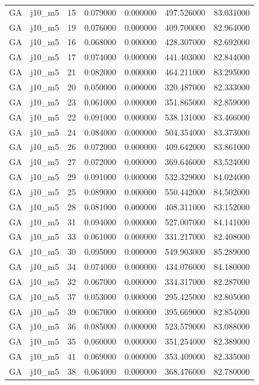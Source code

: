 \begin{tabular}{llrrrrr}
GA & j10_m5 & 15 & 0.079000 & 0.000000 & 497.526000 & 83.031000 \\
GA & j10_m5 & 19 & 0.076000 & 0.000000 & 409.700000 & 82.964000 \\
GA & j10_m5 & 16 & 0.068000 & 0.000000 & 428.307000 & 82.692000 \\
GA & j10_m5 & 17 & 0.074000 & 0.000000 & 441.403000 & 82.844000 \\
GA & j10_m5 & 21 & 0.082000 & 0.000000 & 464.211000 & 83.295000 \\
GA & j10_m5 & 20 & 0.050000 & 0.000000 & 320.487000 & 82.333000 \\
GA & j10_m5 & 23 & 0.061000 & 0.000000 & 351.865000 & 82.859000 \\
GA & j10_m5 & 22 & 0.091000 & 0.000000 & 538.131000 & 83.466000 \\
GA & j10_m5 & 24 & 0.084000 & 0.000000 & 504.354000 & 83.373000 \\
GA & j10_m5 & 26 & 0.072000 & 0.000000 & 409.642000 & 83.861000 \\
GA & j10_m5 & 27 & 0.072000 & 0.000000 & 369.646000 & 83.524000 \\
GA & j10_m5 & 29 & 0.091000 & 0.000000 & 532.329000 & 84.024000 \\
GA & j10_m5 & 25 & 0.089000 & 0.000000 & 550.442000 & 84.502000 \\
GA & j10_m5 & 28 & 0.081000 & 0.000000 & 408.311000 & 83.152000 \\
GA & j10_m5 & 31 & 0.094000 & 0.000000 & 527.007000 & 84.141000 \\
GA & j10_m5 & 33 & 0.061000 & 0.000000 & 331.217000 & 82.408000 \\
GA & j10_m5 & 30 & 0.095000 & 0.000000 & 549.903000 & 85.289000 \\
GA & j10_m5 & 34 & 0.074000 & 0.000000 & 434.076000 & 84.180000 \\
GA & j10_m5 & 32 & 0.067000 & 0.000000 & 334.317000 & 82.287000 \\
GA & j10_m5 & 37 & 0.053000 & 0.000000 & 295.425000 & 82.805000 \\
GA & j10_m5 & 39 & 0.067000 & 0.000000 & 395.669000 & 82.854000 \\
GA & j10_m5 & 36 & 0.085000 & 0.000000 & 523.579000 & 83.088000 \\
GA & j10_m5 & 35 & 0.060000 & 0.000000 & 351.254000 & 82.389000 \\
GA & j10_m5 & 41 & 0.069000 & 0.000000 & 353.409000 & 82.335000 \\
GA & j10_m5 & 38 & 0.064000 & 0.000000 & 368.476000 & 82.780000 \\

\end{tabular}
